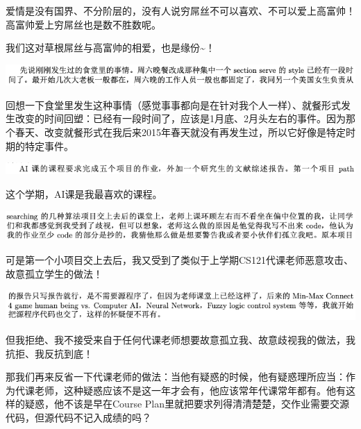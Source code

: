 \documentclass[9pt, b5paper]{article}
\begin{document}
爱情是没有国界、不分阶层的，没有人说穷屌丝不可以喜欢、不可以爱上高富帅！高富帅爱上穷屌丝也是数不胜数呢。

我们这对草根屌丝与高富帅的相爱，也是缘份\textasciitilde{}！

\begin{center}
\includegraphics[width=.9\linewidth]{./pic/backups_plans_20210503_215802.png}
\end{center}

回想一下食堂里发生这种事情（感觉事事都向是在针对我个人一样）、就餐形式发生改变的时间回塑：已经有一段时间了，应该是1月底、2月头左右的事件。因为那个春天、改变就餐形式在我后来2015年春天就没有再发生过，所以它好像是特定时期的特定事件。 

\begin{center}
\includegraphics[width=.9\linewidth]{./pic/backups_plans_20210504_113259.png}
\end{center}

这个学期，AI课是我最喜欢的课程。

\begin{center}
\includegraphics[width=.9\linewidth]{./pic/backups_plans_20210504_113353.png}
\end{center}

可是第一个小项目交上去后，我又受到了类似于上学期CS121代课老师恶意攻击、故意孤立学生的做法！

\begin{center}
\includegraphics[width=.9\linewidth]{./pic/backups_plans_20210504_113458.png}
\end{center}

但我拒绝、我不接受来自于任何代课老师想要故意孤立我、故意歧视我的做法，我抗拒、我反抗到底！

那我们再来反省一下代课老师的做法：当他有疑惑的时候，他有疑惑理所应当：作为代课老师，这种疑惑应该不是这一年才会有，他应该常年代课常年都有。他有这样的疑惑，他不该是早在Course Plan里就把要求列得清清楚楚，交作业需要交源代码，但源代码不记入成绩的吗？
\end{document}
